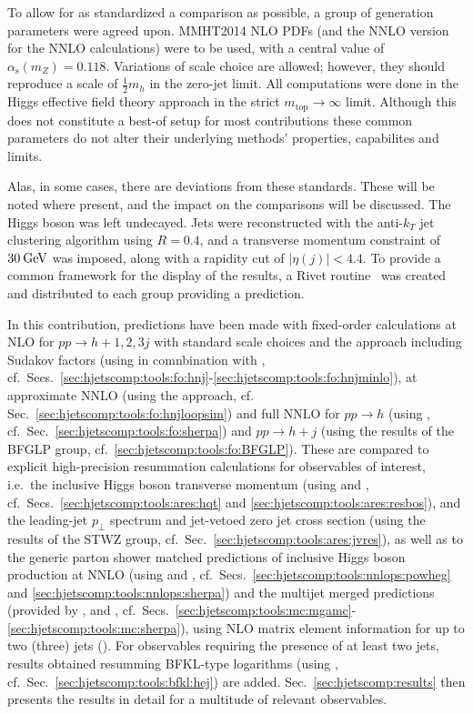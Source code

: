 To allow for as standardized a comparison as possible, a group of
generation parameters were agreed upon. MMHT2014 NLO PDFs (and the
NNLO version for the NNLO calculations) were to be used, with a
central value of $\alpha_\mathrm{s}(m_Z)=0.118$.  
Variations of scale choice are allowed; however, they
should reproduce a scale of $\tfrac{1}{2}m_h$ in the zero-jet limit. 
All computations were done in the Higgs effective field theory approach 
in the strict $m_\text{top}\to\infty$ limit. Although this does not constitute 
a best-of setup for most contributions these common parameters do not 
alter their underlying methods' properties, capabilites and limits.

Alas, in some cases, there are deviations from these standards. These
will be noted where present, and the impact on the comparisons will be
discussed.  The Higgs boson was left undecayed. Jets were reconstructed 
with the anti-$k_T$ jet clustering algorithm \cite{Cacciari:2008gp} using
$R=0.4$, and a transverse momentum constraint of $30\text{\:GeV}$ was imposed,
along with a rapidity cut of $|\eta(j)|<4.4$.  To provide a common
framework for the display of the results, a Rivet
routine~\cite{Buckley:2010ar,webpage} was created and distributed to each group
providing a prediction.

In this contribution, predictions have been made with fixed-order
calculations at NLO for $pp\to h+1,2,3j$ with standard scale choices 
and the \Minlo approach including Sudakov factors (using \GoSam in 
comnbination with \Sherpa, cf.\ Secs.\ 
\ref{sec:hjetscomp:tools:fo:hnj}-\ref{sec:hjetscomp:tools:fo:hnjminlo}), 
at approximate NNLO (using the \Loopsim approach, cf. Sec.\ 
\ref{sec:hjetscomp:tools:fo:hnjloopsim}) and full NNLO for $pp\to h$ 
(using \Sherpa, cf.\ Sec.\ \ref{sec:hjetscomp:tools:fo:sherpa}) and 
$pp\to h+j$ (using the results of the BFGLP group, cf.\ 
\ref{sec:hjetscomp:tools:fo:BFGLP}). These are compared to explicit 
high-precision resummation calculations for observables of interest, 
i.e.\ the inclusive Higgs boson transverse momentum (using \HqT and \Resbos, cf.\ 
Secs.\ \ref{sec:hjetscomp:tools:ares:hqt} and 
\ref{sec:hjetscomp:tools:ares:resbos}), and the leading-jet $p_\perp$ spectrum 
and jet-vetoed zero jet 
cross section (using the results of the STWZ group, cf.\ Sec.\ 
\ref{sec:hjetscomp:tools:ares:jvres}), as well as to the generic 
parton shower matched predictions of inclusive Higgs boson production 
at NNLO (using \Powheg and \Sherpa, cf.\ Secs.\ 
\ref{sec:hjetscomp:tools:nnlops:powheg} and 
\ref{sec:hjetscomp:tools:nnlops:sherpa}) and the multijet merged 
predictions (provided by \MGaMC, \Herwig and \Sherpa, cf.\ Secs.\ 
\ref{sec:hjetscomp:tools:mc:mgamc}-\ref{sec:hjetscomp:tools:mc:sherpa}), 
using NLO matrix element information for up to two (three) jets (\Sherpa). 
For observables requiring the presence of at least two jets, results 
obtained resumming BFKL-type logarithms (using \Hej, cf.\ Sec.\ 
\ref{sec:hjetscomp:tools:bfkl:hej}) are added. 
Sec.\ \ref{sec:hjetscomp:results} then presents the results in detail 
for a multitude of relevant observables.
